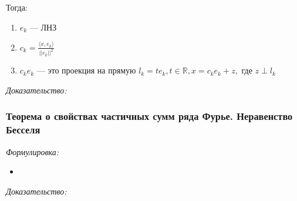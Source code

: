 \documentclass{article}
\begin{document}
Тогда:

\begin{enumerate}
    \item ${e_k}$ --- ЛНЗ
    \item $c_k = \frac{\langle x, e_k \rangle}{||e_k||^2}$
    \item $c_ke_k$ --- это проекция на прямую $l_k = {te_k, t \in \mathbb{R}}, x = c_ke_k + z, $ где $z \perp l_k$
\end{enumerate}

\textit{Доказательство:}


\subsubsection{Теорема о свойствах частичных сумм ряда Фурье. Неравенство Бесселя}
\textit{Формулировка:}

\begin{itemize}
    \item 
\end{itemize}

\textit{Доказательство:}
\end{document}

